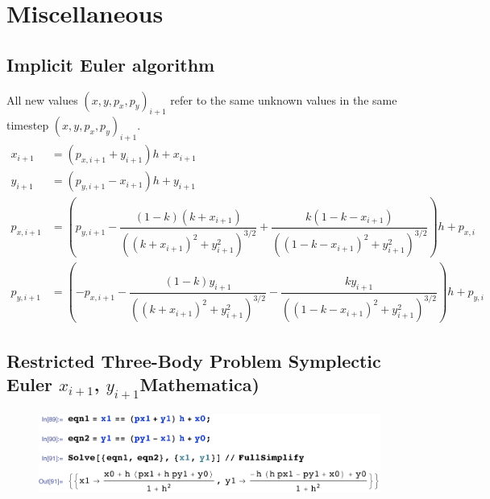 \chapter{Miscellaneous} \label{app:misc}

\section{Implicit Euler algorithm} \label{app:implicit_euler}
All new values $(x,y,p_x,p_y)_{i+1}$ refer to the same unknown values in the same timestep $(x,y,p_x,p_y)_{i+1}$.
\begin{align}
x_{i+1} &= (p_{x,i+1} + y_{i+1})h + x_{i+1} \\[0.2cm]
y_{i+1} &= (p_{y,i+1} - x_{i+1})h + y_{i+1} \\[0.2cm]
p_{x,i+1} &= \left(p_{y,i+1} - \dfrac{(1-k)(k+x_{i+1})}{((k+x_{i+1})^2+y_{i+1}^2)^{3/2}} + \dfrac{k(1-k-x_{i+1})}{((1-k-x_{i+1})^2+y_{i+1}^2)^{3/2}}\right)h + p_{x,i} \\[0.2cm]
p_{y,i+1} &= \left(-p_{x,i+1} - \dfrac{(1-k)y_{i+1}}{((k+x_{i+1})^2+y_{i+1}^2)^{3/2}} - \dfrac{k y_{i+1}}{((1-k-x_{i+1})^2+y_{i+1}^2)^{3/2}}\right)h + p_{y,i}
\end{align}

\section{Restricted Three-Body Problem Symplectic Euler \texorpdfstring{$x_{i+1}$, $y_{i+1}$} (Mathematica)} \label{app:r3b-symplectic-euler}
\begin{figure}[h!]
\centering 
\includegraphics[scale=0.8]{appendices/Miscellaneous/symplectic_euler_derivation.pdf}
\end{figure}

\newpage

